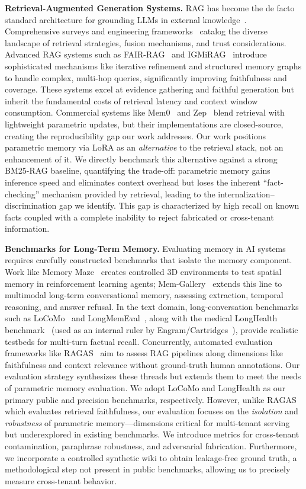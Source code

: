\documentclass[conference]{IEEEtran}
\begin{document}
\textbf{Retrieval-Augmented Generation Systems.} RAG has become the de facto standard architecture for grounding LLMs in external knowledge~\cite{lewis2020rag}. Comprehensive surveys and engineering frameworks~\cite{ragsurvey2026} catalog the diverse landscape of retrieval strategies, fusion mechanisms, and trust considerations. Advanced RAG systems such as FAIR-RAG~\cite{fairrag2026} and IGMiRAG~\cite{igmirag2026} introduce sophisticated mechanisms like iterative refinement and structured memory graphs to handle complex, multi-hop queries, significantly improving faithfulness and coverage. These systems excel at evidence gathering and faithful generation but inherit the fundamental costs of retrieval latency and context window consumption. Commercial systems like Mem0~\cite{chhikara2025mem0} and Zep~\cite{zep2025} blend retrieval with lightweight parametric updates, but their implementations are closed-source, creating the reproducibility gap our work addresses. Our work positions parametric memory via LoRA as an \textit{alternative} to the retrieval stack, not an enhancement of it. We directly benchmark this alternative against a strong BM25-RAG baseline, quantifying the trade-off: parametric memory gains inference speed and eliminates context overhead but loses the inherent ``fact-checking'' mechanism provided by retrieval, leading to the internalization--discrimination gap we identify. This gap is characterized by high recall on known facts coupled with a complete inability to reject fabricated or cross-tenant information.

\textbf{Benchmarks for Long-Term Memory.} Evaluating memory in AI systems requires carefully constructed benchmarks that isolate the memory component. Work like Memory Maze~\cite{memorymaze2022pasukonis} creates controlled 3D environments to test spatial memory in reinforcement learning agents; Mem-Gallery~\cite{memgallery2026} extends this line to multimodal long-term conversational memory, assessing extraction, temporal reasoning, and answer refusal. In the text domain, long-conversation benchmarks such as LoCoMo~\cite{jo2024locomo} and LongMemEval~\cite{yang2024longmemeval}, along with the medical LongHealth benchmark~\cite{kbressem2024longhealth} (used as an internal ruler by Engram/Cartridges~\cite{hazy2025cartridges}), provide realistic testbeds for multi-turn factual recall. Concurrently, automated evaluation frameworks like RAGAS~\cite{es2023ragas} aim to assess RAG pipelines along dimensions like faithfulness and context relevance without ground-truth human annotations. Our evaluation strategy synthesizes these threads but extends them to meet the needs of parametric memory evaluation. We adopt LoCoMo and LongHealth as our primary public and precision benchmarks, respectively. However, unlike RAGAS which evaluates retrieval faithfulness, our evaluation focuses on the \textit{isolation} and \textit{robustness} of parametric memory---dimensions critical for multi-tenant serving but underexplored in existing benchmarks. We introduce metrics for cross-tenant contamination, paraphrase robustness, and adversarial fabrication. Furthermore, we incorporate a controlled synthetic wiki to obtain leakage-free ground truth, a methodological step not present in public benchmarks, allowing us to precisely measure cross-tenant behavior.
\end{document}
